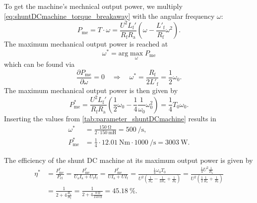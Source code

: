 \begin{solutionblock}
  To get the machine's mechnical output power, we multiply \eqref{eq:shuntDCmachine_torque_breakaway} with the angular frequency $\omega$:
  \begin{equation}
    P_\mathrm{me} = T \cdot \omega = \frac{U^2 L_{\mathrm{f}}'}{R_\mathrm{f} R_\mathrm{a}} \left(\omega - \frac{L'_\mathrm{f}}{R_\mathrm{f}} \omega^2\right).
  \end{equation}
  The maximum mechanical output power is reached at 
  \begin{equation}
    \omega^* = \mathrm{arg} \max_\omega P_\mathrm{me}
  \end{equation}
  which can be found via 
  \begin{equation}
    \frac{\partial P_\mathrm{me}}{\partial \omega} = 0 \quad \Rightarrow \quad \omega^* = \frac{R_\mathrm{f}}{2 L'_\mathrm{f}}=\frac{1}{2}\omega_0.
  \end{equation}
  The maximum mechanical output power is then given by
  \begin{equation}
    P_\mathrm{me}^* = \frac{U^2 L_{\mathrm{f}}'}{R_\mathrm{f} R_\mathrm{a}} \left(\frac{1}{2}\omega_0 - \frac{1}{4} \frac{1}{\omega_0}\omega_0^2\right) = \frac{1}{4}T_0\omega_0 .
  \end{equation}
  Inserting the values from \autoref{tab:parameter_shuntDCmachine} results in
  \begin{equation}
    \begin{split}
      \omega^* &= \frac{\SI{150}{\ohm}}{2 \cdot \SI{150}{\milli\henry}} = \SI{500}{\per\second},\\
      P_\mathrm{me}^* &= \frac{1}{4} \cdot \SI{12.01}{\newton \metre} \cdot \SI{1000}{\per\second} = \SI{3003}{\watt}.
    \end{split}
  \end{equation}
  \end{solutionblock}

\begin{solutionblock}
  The efficiency of the shunt DC machine at its maximum output power is given by
  \begin{equation}
    \begin{split}
      \eta^* &= \frac{P_\mathrm{me}^*}{P_\mathrm{el}} = \frac{P_\mathrm{me}^*}{U_\mathrm{a} I_\mathrm{a} +U_\mathrm{f} I_\mathrm{f}} = \frac{P_\mathrm{me}^*}{U I_\mathrm{a} + U I_\mathrm{f}} = \frac{\frac{1}{4}\omega_0 T_0}{U^2 \left(\frac{1}{R_\mathrm{a}}-\frac{1}{2 R_\mathrm{a}}+\frac{1}{R_\mathrm{f}}\right)} = \frac{\frac{1}{4}U^2\frac{1}{R_\mathrm{a}}}{U^2 \left(\frac{1}{2}\frac{1}{R_\mathrm{a}}+\frac{1}{R_\mathrm{f}}\right)} \\
       &= \frac{1}{2+4\frac{R_\mathrm{a}}{R_\mathrm{f}}}= \frac{1}{2+4\frac{\SI{8}{\ohm}}{\SI{150}{\ohm}}} =\SI{45.18}{\percent}.
  \end{split}
\end{equation}
\end{solutionblock}

